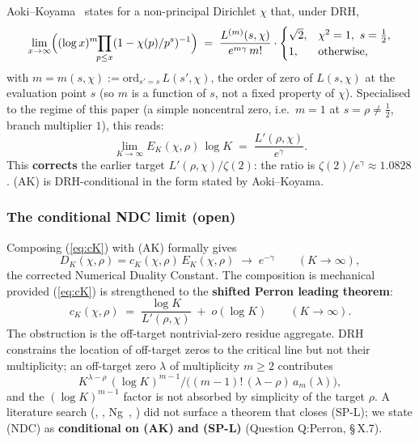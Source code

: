 Aoki--Koyama~\cite[eq.~(1.4), p.~235]{AokiKoyama2023}
states for a non-principal Dirichlet \(\chi\) that, under DRH,
\[
\lim_{x \to \infty}\Bigl((\log x)^{m}\!\!\prod_{p \le x}(1 - \chi(p)/p^s)^{-1}\Bigr)
\;=\;
\frac{L^{(m)}(s,\chi)}{e^{m\gamma}\,m!} \cdot
\begin{cases}\sqrt 2, & \chi^2 = 1,\ s = \tfrac12,\\ 1, & \text{otherwise,}\end{cases}
\]
with \(m = m(s,\chi) := \mathrm{ord}_{s' = s}\,L(s',\chi)\), the order
of zero of \(L(s,\chi)\) at the evaluation point \(s\) (so \(m\) is a
function of \(s\), not a fixed property of \(\chi\)). Specialised to the
regime of this paper (a simple noncentral zero, i.e.~\(m = 1\) at
\(s = \rho \ne \tfrac12\), branch multiplier \(1\)), this reads:
\begin{equation}
\label{eq:AK}
\lim_{K \to \infty} E_K(\chi,\rho)\,\log K \;=\; \frac{L'(\rho,\chi)}{e^{\gamma}}.
\tag*{(AK)}
\end{equation}
This \textbf{corrects} the earlier target \(L'(\rho,\chi) / \zeta(2)\): the
ratio is \(\zeta(2)/e^\gamma \approx 1.0828\). (AK) is DRH-conditional
in the form stated by Aoki--Koyama.

\subsubsection{The conditional NDC limit (open)}

Composing (\ref{eq:cK}) with (AK) formally gives
\begin{equation}
\label{eq:NDC}
D_K(\chi,\rho) = c_K(\chi,\rho)\,E_K(\chi,\rho)
\;\longrightarrow\; e^{-\gamma}
\qquad (K \to \infty),
\tag*{(NDC)}
\end{equation}
the corrected Numerical Duality Constant. The composition is
mechanical provided (\ref{eq:cK}) is strengthened to the \textbf{shifted
Perron leading theorem}:
\begin{equation}
\label{eq:Perron-leading}
c_K(\chi,\rho) \;=\; \frac{\log K}{L'(\rho,\chi)} \;+\; o(\log K)
\qquad (K \to \infty).
\tag*{(SP-L)}
\end{equation}
The obstruction is the off-target nontrivial-zero residue aggregate.
DRH constrains the location of off-target zeros to the critical line
but not their multiplicity; an off-target zero \(\lambda\) of
multiplicity \(m \ge 2\) contributes
\[
K^{\lambda - \rho}\,(\log K)^{m-1}\big/\bigl((m-1)!\,(\lambda - \rho)\,a_m(\lambda)\bigr),
\]
and the \((\log K)^{m-1}\) factor is not absorbed by simplicity of the
target \(\rho\). A literature search (\cite{Inoue2021}, \cite{Soundararajan2009},
Ng~\cite{Ng2004}, \cite{AkatsukaH2013EulerProduct}) did not surface a theorem that closes
(SP-L); we state (NDC) as \textbf{conditional on (AK) and (SP-L)}
(Question Q:Perron, \S\,X.7).

